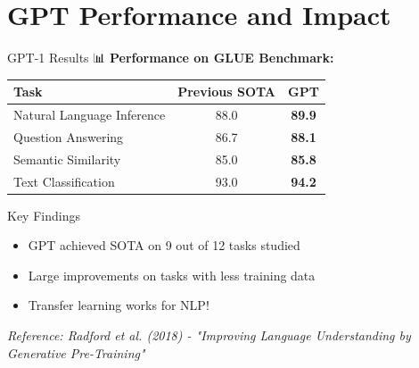 \documentclass[aspectratio=169]{beamer}
\begin{document}
\section{GPT Performance and Impact}

\begin{frame}{GPT-1 Results 📊}
    \textbf{Performance on GLUE Benchmark:}

    \vspace{0.3cm}

    \begin{table}
        \small
        \begin{tabular}{lcc}
            \toprule
            \textbf{Task} & \textbf{Previous SOTA} & \textbf{GPT} \\
            \midrule
            Natural Language Inference & 88.0 & \textbf{89.9} \\
            Question Answering & 86.7 & \textbf{88.1} \\
            Semantic Similarity & 85.0 & \textbf{85.8} \\
            Text Classification & 93.0 & \textbf{94.2} \\
            \bottomrule
        \end{tabular}
    \end{table}

    \vspace{0.3cm}

    \begin{alertblock}{Key Findings}
        \begin{itemize}\setlength{\itemsep}{0pt}
            \item GPT achieved SOTA on 9 out of 12 tasks studied
            \item Large improvements on tasks with less training data
            \item Transfer learning works for NLP!
        \end{itemize}
    \end{alertblock}

    \vspace{0.3cm}

    \small
    \textit{Reference: Radford et al. (2018) - "Improving Language Understanding by Generative Pre-Training"}
\end{frame}
\end{document}
